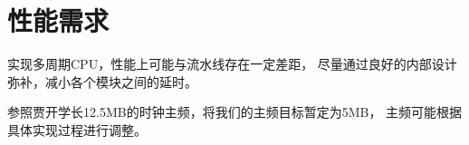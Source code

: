 \section{性能需求}
    实现多周期CPU，性能上可能与流水线存在一定差距，
    尽量通过良好的内部设计弥补，减小各个模块之间的延时。

    参照贾开学长12.5MB的时钟主频，将我们的主频目标暂定为5MB，
    主频可能根据具体实现过程进行调整。
